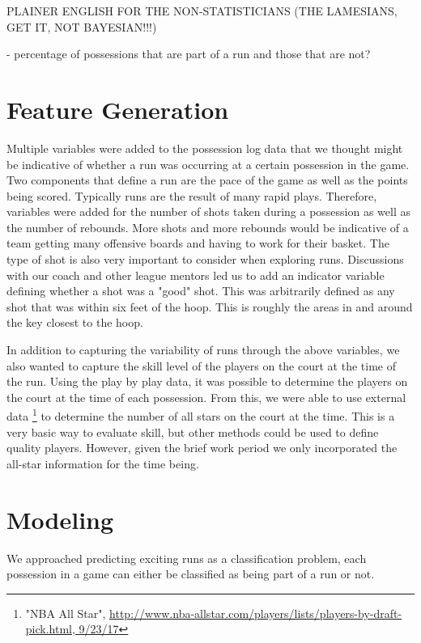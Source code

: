 \documentclass{article}
\begin{document}
PLAINER ENGLISH FOR THE NON-STATISTICIANS (THE LAMESIANS, GET IT, NOT BAYESIAN!!!)

- percentage of possessions that are part of a run and those that are not?

\section{Feature Generation}

Multiple variables were added to the possession log data that we thought might be indicative of whether a run was occurring at a certain possession in the game.  Two components that define a run are the pace of the game as well as the points being scored. Typically runs are the result of many rapid plays. Therefore, variables were added for the number of shots taken during a possession as well as the number of rebounds. More shots and more rebounds would be indicative of a team getting many offensive boards and having to work for their basket. The type of shot is also very important to consider when exploring runs. Discussions with our coach and other league mentors led us to add an indicator variable defining whether a shot was a "good" shot. This was arbitrarily defined as any shot that was within six feet of the hoop. This is roughly the areas in and around the key closest to the hoop. \newline

In addition to capturing the variability of runs through the above variables, we also wanted to capture the skill level of the players on the court at the time of the run. Using the play by play data, it was possible to determine the players on the court at the time of each possession. From this, we were able to use external data \footnote{"NBA All Star", \url{http://www.nba-allstar.com/players/lists/players-by-draft-pick.html, 9/23/17}} to determine the number of all stars on the court at the time. This is a very basic way to evaluate skill, but other methods could be used to define quality players. However, given the brief work period we only incorporated the all-star information for the time being. 

\section{Modeling}

We approached predicting exciting runs as a classification problem, each possession in a game can either be classified as being part of a run or not. 
\end{document}
